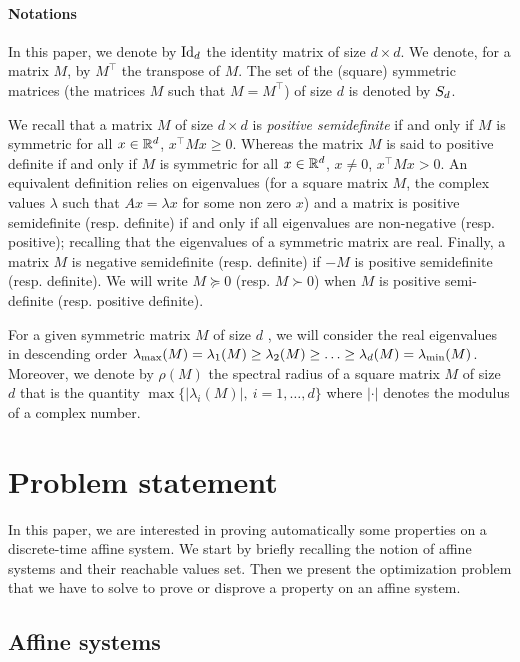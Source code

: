 \documentclass[10pt]{article}
\begin{document}
\paragraph{Notations}
In this paper, we denote by $\operatorname{Id}_d$ the identity matrix of size $d\times d$. We denote, for a matrix $M$, by $M^\intercal$ the transpose of $M$. The set of the (square) symmetric matrices  (the matrices $M$ such that $M=M^\intercal$) of size $d$ is denoted by $S_d$.

We recall that a matrix $M$ of size $d\times d$ is {\it positive semidefinite} if and only if $M$ is symmetric for all $x\in\mathbb R^d$,
$x^\intercal M x\geq 0$. Whereas the matrix $M$ is said to positive definite if and only if $M$ is symmetric for all $x\in\mathbb R^d$, $x\neq 0$, 
$x^\intercal M x>0$. An equivalent definition relies on eigenvalues (for a square matrix $M$, the complex values $\lambda$ such that $Ax=\lambda x$ for some non zero $x$) and a matrix is positive semidefinite (resp. definite) if and only if all eigenvalues are non-negative (resp. positive); recalling that the eigenvalues of a symmetric matrix are real.
Finally, a matrix $M$ is negative semidefinite (resp. definite) if $-M$ is positive semidefinite (resp. definite).
We will write $M\succeq 0$ (resp. $M\succ 0$)  when $M$ is positive semi-definite (resp. positive definite).

For a given symmetric matrix $M$ of size $d$ , we will consider the real eigenvalues in descending order   $\lambda_{\operatorname{max}}(M)=\lambda_1(M)\geq \lambda_2(M)\geq \ldots\geq \lambda_d(M)=\lambda_{\operatorname{min}}(M)$. Moreover, we denote by $\rho(M)$ the spectral radius of a square matrix $M$ of size $d$ that is the quantity $\max\{|\lambda_i(M)|,\ i=1,\ldots,d\}$ where $|\cdot|$ denotes the modulus of a complex number.

\section{Problem statement}
\label{statement}
In this paper, we are interested in proving automatically some properties on a discrete-time affine system. We start by briefly recalling the notion of affine systems and their reachable values set. Then we present the optimization problem that we have to solve to prove or disprove a property on an affine system.

\subsection{Affine systems}
\end{document}
